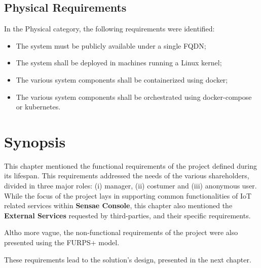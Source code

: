 \subsection{Physical Requirements}
\label{subsec:requirements:non_functional:physical}

In the Physical category, the following requirements were identified:

\begin{itemize}
    \item The system must be publicly available under a single \gls{FQDN};
    \item The system shall be deployed in machines running a Linux kernel;
    \item The various system components shall be containerized using docker;
    \item The various system components shall be orchestrated using docker-compose or kubernetes.
\end{itemize}

\section{Synopsis}
\label{subsec:requirements:synopsis}

This chapter mentioned the functional requirements of the project defined during its lifespan. This requirements addressed the needs of the various shareholders, divided in three major roles: (i) manager, (ii) costumer and (iii) anonymous user. While the focus of the project lays in supporting common functionalities of \gls{IoT} related services within \textbf{Sensae Console}, this chapter also mentioned the \textbf{External Services} requested by third-parties, and their specific requirements.

Altho more vague, the non-functional requirements of the project were also presented using the FURPS+ model.

These requirements lead to the solution's design, presented in the next chapter.
